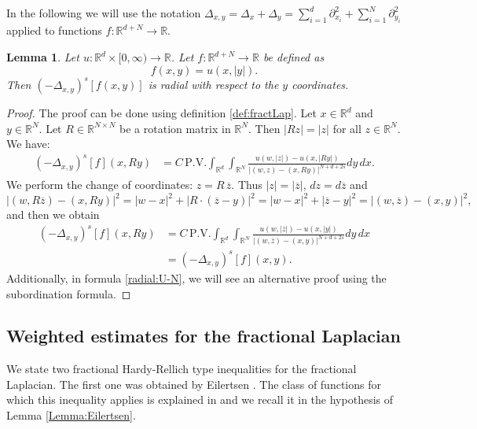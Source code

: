 \documentclass[11pt, twoside, notitlepage]{amsart}
\newtheorem{lemma}[theorem]{Lemma}
\newcommand\R{\mathbb{R}}
\numberwithin{equation}{section}
\begin{document}
In the following we will use the notation $\Delta_{x,y} =\Delta_x + \Delta_y =\sum_{i=1}^d \partial_{x_i}^2  + \sum_{i=1}^N \partial_{y_i}^2  $ applied to functions $f: \R^{d+N}\to \R$.
\begin{lemma} \label{Lemma:radial}
Let $u:\mathbb{R}^{d} \times [0,\infty) \to  \mathbb{R}$. Let $f:  \mathbb{R}^{d+N} \to  \mathbb{R}$ be defined as
$$f(x,y)=u(x,|y|).$$
Then $(-\Delta_{x,y})^s [f(x,y)]$ is radial with respect to the $y$ coordinates.
\end{lemma}
\begin{proof}
The proof can be done using definition \eqref{def:fractLap}.
Let $x\in\mathbb{R}^{d}$ and $  y\in \mathbb{R}^{N}$. Let $R \in \mathbb{R}^{N\times N}$ be a rotation matrix in $\mathbb{R}^{N}$. Then $|Rz|=|z|$ for all $z\in \mathbb{R}^{N}$.
We have:
\begin{align*}
(-\Delta_{x,y} )^s [f](x,Ry)&= C \,  \text{P.V.} \int_{\R^d}\int_{\R^N} \frac{u(w,|z|)-u(x,|Ry|)}{ |(w,z)-(x,Ry)|^{N+d+2s} }dy \, dx.
\end{align*}
We perform the change of coordinates: $z=R\, \overline{z}$. Thus $|z|=|\overline{z}|$,   $dz= d\overline{z}$ and
$$ |(w,R\overline{z})-(x,Ry)|^2 = |w-x|^2 +  |R\cdot (\overline{z}-  y)|^2 = |w-x|^2 +  |\overline{z}-  y|^2 = |(w,\overline{z})-(x,y)|^2 ,$$
and then we obtain
\begin{align*}
(-\Delta_{x,y} )^s [f](x,Ry)&=  C   \,  \text{P.V.} \int_{\R^d}\int_{\R^N} \frac{u(w,|\overline{z}|)-u(x,|y|)}{|(w,\overline{z})-(x,y)|^{N+d+2s}}dy \, dx \\
&=(-\Delta_{x,y} )^s [f](x,y).
\end{align*}
Additionally, in formula \eqref{radial:U-N}, we will see an alternative proof using the subordination formula.
\end{proof}



\subsection{Weighted estimates for the fractional Laplacian}
We state two fractional Hardy-Rellich type inequalities  for the fractional Laplacian. The first one was obtained by Eilertsen \cite{EilertsenJFA2001}. The class of functions for which this inequality applies is explained in \cite[p.362]{EilertsenJFA2001} and we recall it in the hypothesis of Lemma \ref{Lemma:Eilertsen}.
\end{document}
